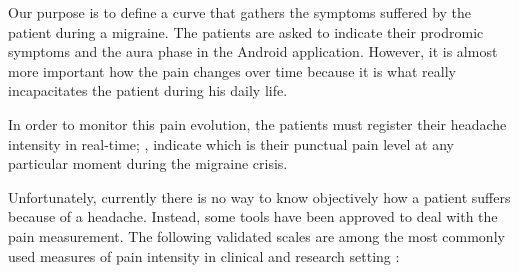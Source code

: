 
\label{sec:paincurve}

Our purpose is to define a curve that gathers the symptoms suffered by
the patient during a migraine. The patients are asked to indicate
their prodromic symptoms and the aura phase in the Android
application. However, it is almost more important how the pain changes
over time because it is what really incapacitates the patient during
his daily life.

In order to monitor this pain evolution, the patients must register
their headache intensity in real-time; \ie, indicate which is their
punctual pain level at any particular moment during the migraine
crisis.

Unfortunately, currently there is no way to know objectively how a
patient suffers because of a headache. Instead, some tools have been
approved to deal with the pain measurement. The following validated
scales are among the most commonly used measures of pain intensity in
clinical and research
setting \cite{hawker2011measures,williamson2005pain,bashir2013comparative,ferreira2011validity}:

